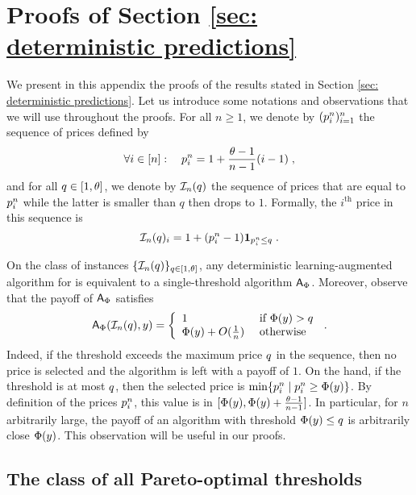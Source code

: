 
\section{Proofs of Section {\ref{sec: deterministic predictions}}}\label{app:sec2}



We present in this appendix the proofs of the results stated in Section \ref{sec: deterministic predictions}. Let us introduce some notations and observations that we will use throughout the proofs.
For all $n \geq 1$, we denote by $(p^n_i)_{i=1}^n$ the sequence of prices defined by
\[
\forall i \in [n]: \quad p^n_i = 1 + \frac{\theta-1}{n-1}(i-1)\;,
\]
and for all $q \in [1,\theta]$, we denote by $\mathcal{I}_n(q)$ the sequence of prices that are equal to $p^n_i$ while the latter is smaller than $q$ then drops to $1$. Formally, the $i^{\text{th}}$ price in this sequence is
\begin{equation}\label{eq:worst-case-instance}
\mathcal{I}_n(q)_i = 1 + (p^n_i -1) \textbf{1}_{p^n_i \leq q}\;.    
\end{equation}

On the class of instances $\{\mathcal{I}_n(q)\}_{q \in [1,\theta]}$,  any deterministic learning-augmented algorithm for \OMS{} is equivalent to a single-threshold algorithm $\mbox{\textup{\textsf{A}}}_\Phi$. 
Moreover, observe that the payoff of $\mbox{\textup{\textsf{A}}}_{\Phi}$ satisfies
\begin{equation}\label{eq:worst-case-payoff}
\mbox{\textup{\textsf{A}}}_{\Phi}(\mathcal{I}_n(q),y) =
\left\{
\begin{array}{ll}
    1 & \mbox{ if } \Phi(y) > q\\
    \Phi(y) + O(\tfrac{1}{n}) & \mbox{ otherwise}
\end{array}
\right.\,.
\end{equation}
Indeed, if the threshold exceeds the maximum price $q$ in the sequence, then no price is selected and the algorithm is left with a payoff of $1$. On the hand, if the threshold is at most $q$, then the selected price is $\min \{p^n_i  \mid p^n_i \geq \Phi(y)\}$. By definition of the prices $p^n_i$, this value is in $[\Phi(y), \Phi(y) + \tfrac{\theta-1}{n-1}]$.
In particular, for $n$ arbitrarily large, the payoff of an algorithm with threshold $\Phi(y) \leq q$ is arbitrarily close $\Phi(y)$. This observation will be useful in our proofs.

\subsection{The class of all Pareto-optimal thresholds}
\AllParetoOptimalThresholds*

